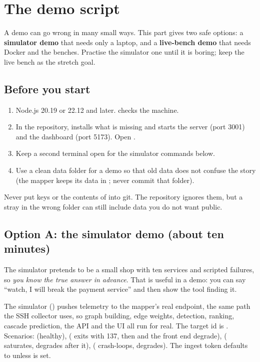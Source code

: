 \chapter{The demo script}
\label{ch:demo}

A demo can go wrong in many small ways. This part gives two safe options: a \textbf{simulator demo} that needs only a laptop, and a \textbf{live-bench demo} that needs Docker and the benches. Practise the simulator one until it is boring; keep the live bench as the stretch goal.

\section{Before you start}
\begin{enumerate}
\item Node.js 20.19 or 22.12 and later.  checks the machine.
\item In the repository,  installs what is missing and starts the server (port 3001) and the dashboard (port 5173). Open .
\item Keep a second terminal open for the simulator commands below.
\item Use a clean data folder for a demo so that old data does not confuse the story (the mapper keeps its data in ; never commit that folder).
\end{enumerate}

\begin{warnbox}
Never put  keys or the contents of  into git. The repository ignores them, but a stray  in the wrong folder can still include data you do not want public.
\end{warnbox}

\section{Option A: the simulator demo (about ten minutes)}
\begin{simplebox}
The simulator pretends to be a small shop with ten services and scripted failures, so \emph{you know the true answer in advance}. That is useful in a demo: you can say ``watch, I will break the payment service'' and then show the tool finding it.
\end{simplebox}

\begin{techbox}
The simulator () pushes telemetry to the mapper's real  endpoint, the same path the SSH collector uses, so graph building, edge weights, detection, ranking, cascade prediction, the API and the UI all run for real. The target id is . Scenarios:  (healthy),  ( exits with 137, then  and the front end degrade),  ( saturates,  degrades after it),  ( crash-loops,  degrades). The ingest token defaults to  unless  is set.
\end{techbox}

